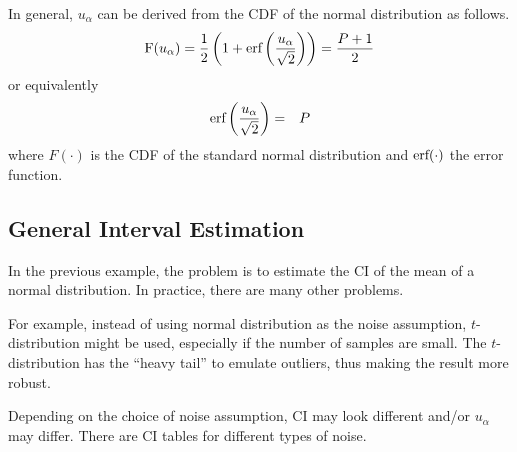 In general, $u_{\alpha}$ can be derived from the CDF of the normal distribution as follows.
\begin{eqnarray}
	\textup{F}(u_\alpha) = \dfrac{1}{2}\left(1+\textup{erf}\left(\dfrac{u_\alpha}{\sqrt{2}}\right)\right) = \dfrac{P+1}{2} \nonumber
\end{eqnarray}
or equivalently
\begin{eqnarray}
	\textup{erf}\left(\dfrac{u_\alpha}{\sqrt{2}}\right) &=& P \nonumber
\end{eqnarray}
where $F(\cdot)$ is the CDF of the standard normal distribution and $\textup{erf}(\cdot)$ the error function.


\subsection{General Interval Estimation}

In the previous example, the problem is to estimate the CI of the mean of a normal distribution. In practice, there are many other problems. 

For example, instead of using normal distribution as the noise assumption, $t$-distribution might be used, especially if the number of samples are small. The $t$-distribution has the ``heavy tail'' to emulate outliers, thus making the result more robust.

Depending on the choice of noise assumption, CI may look different and/or $u_{\alpha}$ may differ. There are CI tables for different types of noise.


